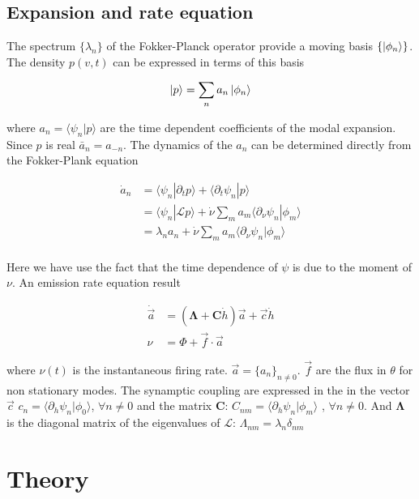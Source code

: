 \documentclass[a4paper,11pt,twoside]{article}
\numberwithin{equation}{section}
\begin{document}
\subsection{Expansion and rate equation}
The spectrum $\{\lambda_n\}$ of the Fokker-Planck operator provide a moving basis $ \{\ket{\phi_n}\}$. The density $p(v,t)$ can be expressed in terms of this basis

\begin{equation}
\label{eq:p}
\ket{p}=\sum_na_n\ket{\phi_n}
\end{equation}

where $a_n=\langle \psi_n | p\rangle$ are the time dependent coefficients of the modal expansion. Since $p$ is real $\bar{a}_n=a_{-n}$. The dynamics of the $a_n$ can be determined directly from the Fokker-Plank equation

\begin{align}
\dot{a}_n&=\langle\psi_n|\partial_t p\rangle+\langle\partial_t\psi_n|p\rangle \nonumber \\
&=\langle\psi_n|\mathcal{L}p\rangle+  \dot{\nu}\sum_ma_m\langle\partial_\nu\psi_n|\phi_m \rangle \nonumber \\
&=\lambda_n a_n +  \dot{\nu}\sum_ma_m\langle\partial_\nu\psi_n|\phi_m \rangle \nonumber \\
\end{align}

Here we have use the fact that the time dependence of $\psi$ is due to the moment of $\nu$. An emission rate equation result

\begin{align}
\dot{\vec{a}}&=(\boldsymbol{\Lambda}+\boldsymbol{C}\dot{h})\vec{a}+\vec{c}\dot{h}\nonumber\\
\nu&=\Phi+\vec{f}\cdot\vec{a}
\end{align}

where $\nu(t)$ is the instantaneous firing rate. $\vec{a}=\{a_n\}_{n \neq 0}$. $\vec{f}$ are the flux in $\theta$ for non stationary modes. The synamptic coupling are expressed in the in the vector $\vec{c}$ $c_n=\langle\partial_h\psi_n|\phi_0\rangle$, $\forall n \neq 0$ and the matrix $\boldsymbol{C}$: $C_{nm}=\langle\partial_h\psi_n|\phi_m\rangle$ , $\forall n \neq 0$. And $\boldsymbol{\Lambda}$ is the diagonal matrix of the eigenvalues of $\mathcal{L}$: $\Lambda_{nm}=\lambda_n\delta_{nm}$





\section{Theory}
\label{sec:theory}
\end{document}
